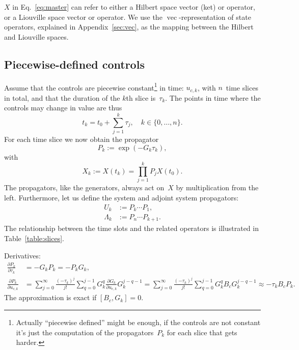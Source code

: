 \documentclass[aps, pra, a4paper, longbibliography]{revtex4}
\newcommand{\be}{\begin{equation}}
\newcommand{\ee}{\end{equation}}
\newcommand{\comm}[2]{\left[ #1, #2 \right]}
\DeclareMathOperator{\cvec}{vec}
\newcommand{\dd}[2]{\frac{\partial #1}{\partial #2}}
\begin{document}
$X$ in Eq.~\eqref{eq:master} can refer to either a Hilbert space
vector (ket) or operator, or a Liouville space vector
or operator.
We use the $\cvec$-representation of state
operators, explained in Appendix~\ref{sec:vec},
as the mapping between the Hilbert and Liouville spaces.

\subsection{Piecewise-defined controls}

Assume that the controls are
piecewise constant\footnote{Actually ``piecewise defined'' might be
  enough, if the controls are not constant it's just the computation
  of the propagators~$P_k$ for each slice that gets harder.}
in time: $u_{c, k}$, with $n$~time slices in total,
and that the duration of the $k$th slice is~$\tau_k$.
The points in time where the controls may change in value are thus
\be
t_k = t_0 + \sum_{j=1}^{k} \tau_j, \quad k \in \{0, \ldots, n\}.
\ee
For each time slice we now obtain the propagator
\be
P_k := \exp(-G_k \tau_k),
\ee
with
\be
\label{eq:Xn}
X_k := X(t_k) = \prod_{j=1}^{k} P_j X(t_0).
\ee
The propagators, like the generators, always act on~$X$ by multiplication
from the left.
Furthermore, let us define the system and adjoint system propagators:
\begin{align}
U_k &:= P_k \cdots P_1,\\      %
\Lambda_k &:= P_n \cdots P_{k+1}.
\end{align}
The relationship between the time slots and the related operators is
illustrated in Table~\ref{table:slices}.


Derivatives:
\begin{align}
\dd{P_k}{\tau_k}  &= -G_k P_k = -P_k G_k,\\
\dd{P_k}{u_{c,k}}
&=
\sum_{j=0}^{\infty} \frac{(-\tau_k)^j}{j!}
\sum_{q=0}^{j-1}
G_k^{q} \dd{G_k}{u_{c,k}} G_k^{j-q-1}
=
\sum_{j=0}^{\infty} \frac{(-\tau_k)^j}{j!}
\sum_{q=0}^{j-1}
G_k^{q} B_c G_k^{j-q-1}
\approx -\tau_k B_c P_k.
\end{align}
The approximation is exact if $\comm{B_c}{G_k} = 0$.
\end{document}

